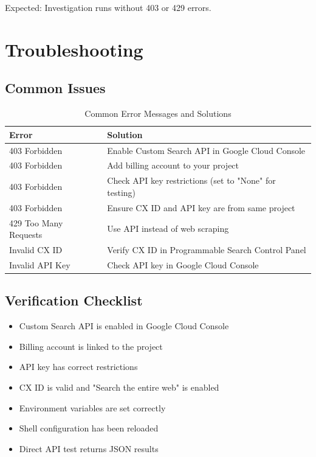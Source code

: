 \documentclass[11pt,a4paper]{article}
\begin{document}
Expected: Investigation runs without 403 or 429 errors.

\section{Troubleshooting}

\subsection{Common Issues}

\begin{table}[H]
\centering
\begin{tabularx}{\textwidth}{|X|X|}
\hline
\textbf{Error} & \textbf{Solution} \\
\hline
403 Forbidden & Enable Custom Search API in Google Cloud Console \\
\hline
403 Forbidden & Add billing account to your project \\
\hline
403 Forbidden & Check API key restrictions (set to "None" for testing) \\
\hline
403 Forbidden & Ensure CX ID and API key are from same project \\
\hline
429 Too Many Requests & Use API instead of web scraping \\
\hline
Invalid CX ID & Verify CX ID in Programmable Search Control Panel \\
\hline
Invalid API Key & Check API key in Google Cloud Console \\
\hline
\end{tabularx}
\caption{Common Error Messages and Solutions}
\end{table}

\subsection{Verification Checklist}

\begin{itemize}
    \item[$\checkmark$] Custom Search API is enabled in Google Cloud Console
    \item[$\checkmark$] Billing account is linked to the project
    \item[$\checkmark$] API key has correct restrictions
    \item[$\checkmark$] CX ID is valid and "Search the entire web" is enabled
    \item[$\checkmark$] Environment variables are set correctly
    \item[$\checkmark$] Shell configuration has been reloaded
    \item[$\checkmark$] Direct API test returns JSON results
\end{itemize}
\end{document}
